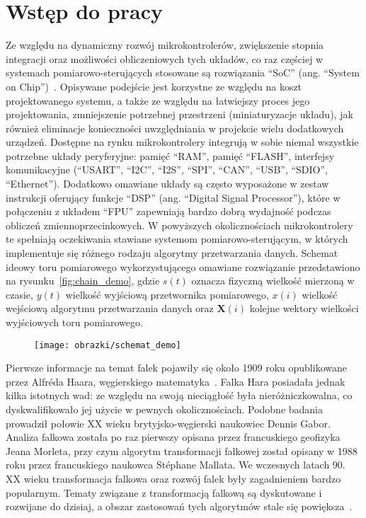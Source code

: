 \chapter{Wstęp do pracy}

Ze względu na dynamiczny rozwój mikrokontrolerów, zwiększenie stopnia integracji oraz możliwości obliczeniowych tych układów, co raz częściej w systemach pomiarowo-sterujących stosowane są rozwiązania \enquote{SoC} (ang. \enquote{System on Chip})~\cite{saleh_systemonchip}. Opisywane podejście jest korzystne ze względu na koszt projektowanego systemu, a także ze względu na łatwiejszy proces jego projektowania, zmniejszenie potrzebnej przestrzeni (miniaturyzacje układu), jak również eliminacje konieczności uwzględniania w projekcie wielu dodatkowych urządzeń. Dostępne na rynku mikrokontrolery integrują w sobie niemal wszystkie potrzebne układy peryferyjne: pamięć \enquote{RAM}, pamięć \enquote{FLASH}, interfejsy komunikacyjne (\enquote{USART}, \enquote{I2C}, \enquote{I2S}, \enquote{SPI}, \enquote{CAN}, \enquote{USB}, \enquote{SDIO}, \enquote{Ethernet}). Dodatkowo omawiane układy są często wyposażone w zestaw instrukcji oferujący funkcje \enquote{DSP} (ang. \enquote{Digital Signal Processor}), które w połączeniu z układem \enquote{FPU} zapewniają bardzo dobrą wydajność podczas obliczeń zmiennoprzecinkowych. W powyższych okolicznościach mikrokontrolery te spełniają oczekiwania stawiane systemom pomiarowo-sterującym, w których implementuje się różnego rodzaju algorytmy przetwarzania danych. Schemat ideowy toru pomiarowego wykorzystującego omawiane rozwiązanie przedstawiono na rysunku~\ref{fig:chain_demo}, gdzie $s(t)$ oznacza fizyczną wielkość mierzoną w czasie, $y(t)$ wielkość wyjściową przetwornika pomiarowego, $x(i)$ wielkość wejściową algorytmu przetwarzania danych oraz $\mathbf{X}(i)$ kolejne wektory wielkości wyjściowych toru pomiarowego.

\begin{figure}[htb!]
\begin{center}
\texttt{[image: obrazki/schemat\_demo]}
\end{center}
\end{figure}

Pierwsze informacje na temat falek pojawiły się około 1909 roku opublikowane przez Alfréda Haara, węgierskiego matematyka~\cite{haar_basics}. Falka Hara posiadała jednak kilka istotnych wad: ze względu na swoją nieciągłość była nieróżniczkowalna, co dyskwalifikowało jej użycie w pewnych okolicznościach. Podobne badania prowadził połowie XX wieku brytyjsko-węgierski naukowiec Dennis Gabor. Analiza falkowa została po raz pierwszy opisana przez francuskiego geofizyka Jeana Morleta, przy czym algorytm transformacji falkowej został opisany w 1988 roku przez francuskiego naukowca Stéphane Mallata. We wczesnych latach 90. XX wieku transformacja falkowa oraz rozwój falek były zagadnieniem bardzo popularnym. Tematy związane z transformacją falkową są dyskutowane i rozwijane do dzisiaj, a obszar zastosowań tych algorytmów stale się powiększa~\cite{akujuobi_applications}.

